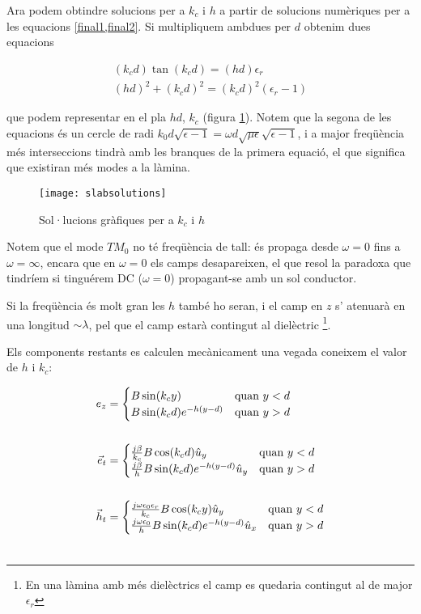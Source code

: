 Ara podem obtindre solucions per a $k_c$ i $h$ a partir de solucions numèriques per a les equacions \cref{final1,final2}. Si multipliquem ambdues per $d$ obtenim dues equacions 

\begin{subequations}
  \begin{align}
    (k_c d) \tan (k_c d) = (h d ) \epsilon _r \\
    (hd)^2 + (k_c d ) ^2 = (k_c d) ^2 ( \epsilon _r - 1 )
  \end{align}
\end{subequations}

que podem representar en el pla $hd$, $k_c$ (figura \cref{slabsolutions}). Notem que la segona de les equacions és un cercle de radi $k_0 d \sqrt{\epsilon - 1} = \omega d \sqrt{\mu \epsilon}\sqrt{\epsilon - 1}  $, i a major freqüència més interseccions tindrà amb les branques de la primera equació, el que significa que existiran més modes a la làmina. 

\begin{figure}[ht]
  \centering
  \texttt{[image: slabsolutions]}
  \caption{Sol·lucions gràfiques per a $k_c$ i $h$}
  \label{slabsolutions}
\end{figure}

Notem que el mode $TM_0$ no té freqüència de tall: és propaga desde $\omega= 0$ fins a $\omega = \infty$, encara que en $\omega = 0$ els camps desapareixen, el que resol la paradoxa que tindríem si tinguérem DC ($\omega = 0$) propagant-se amb un sol conductor.

Si la freqüència és molt gran les $h$ també ho seran, i el camp en $z$ s' atenuarà en una longitud $\sim \lambda$, pel que el camp estarà contingut al dielèctric \footnote{En una làmina amb més dielèctrics el camp es quedaria contingut al de major $\epsilon_r$}.

Els components restants es calculen mecànicament una vegada coneixem el valor de $h$ i $k_c$:

\begin{align}
  e_z &=  \begin{cases}
    B \sin (k_c y) & \text{quan }  y < d \\
    B \sin (k_c d) e^{-h(y - d)} & \text{quan } y > d
   \end{cases}\\
   \nonumber \\
  \vec e_t &= \begin{cases}
    \frac{j \beta}{k_c} B \cos (k_c d)  \hat u_y  & \text{quan }  y < d \\
    \frac{j \beta}{h} B \sin (k_c d) e^{-h (y - d)} \hat u_y & \text{quan } y > d
  \end{cases} \\
   \nonumber \\
  \vec h_t &= \begin{cases}
    \frac{j \omega \epsilon_0 \epsilon_r}{k_c} B \cos (k_c y)  \hat u_y & \text{quan } y < d \\
    \frac{j \omega \epsilon_0}{h} B \sin (k_c d) e^{-h (y - d)} \hat u_x & \text{quan } y > d 
  \end{cases}  \\
   \nonumber 
\end{align} 